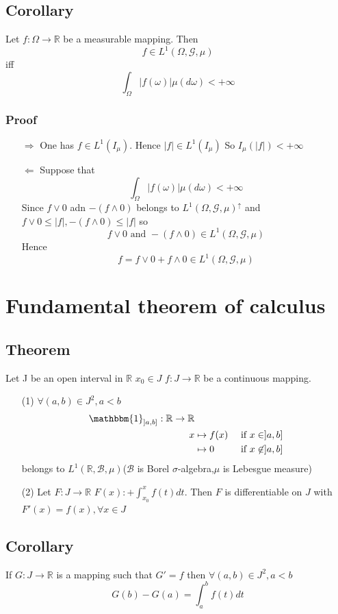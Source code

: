 \documentclass{book}
\newcommand{\abs}[1]{\left\lvert #1 \right\rvert}
\newcommand{\rightbracket}{]}
\begin{document}
\section{Corollary}
Let $f:\Omega\rightarrow\mathbb{R}$ be a measurable mapping. Then $$f\in L^1(\Omega,\mathcal{G},\mu)$$iff$$\int_\Omega\abs{f(\omega)}\mu(d\omega)<+\infty$$
\subsection*{Proof}
\begin{itemize}
    \item [$\Rightarrow$]One has $f\in L^1(I_\mu)$. Hence $\abs{f}\in L^1(I_\mu)$ So $I_\mu(\abs{f})<+\infty$
    \item [$\Leftarrow$]Suppose that $$\int_\Omega\abs{f(\omega)}\mu(d\omega)<+\infty$$Since $f\vee 0$ adn $-(f\wedge 0)$ belongs to $L^1(\Omega,\mathcal{G},\mu)^\uparrow$ and $f\vee 0\leq\abs{f},-(f\wedge0)\leq\abs{f}$ so $$ f\vee 0\text{ and }-(f\wedge 0)\in L^1(\Omega,\mathcal{G},\mu)$$
    Hence $$f=f\vee0+f\wedge0\in L^1(\Omega,\mathcal{G},\mu)$$
\end{itemize}
\chapter{Fundamental theorem of calculus}
\section{Theorem}
Let J be an open interval in $\mathbb{R}$ $x_0\in J$ $f:J\rightarrow\mathbb{R}$ be a continuous mapping.
\begin{itemize}
    \item[(1)]$\forall (a,b)\in J^2,a<b$
    $$\begin{aligned}
        \mathbbm{1}_{\rightbracket a,b\rightbracket}:\mathbb{R}\rightarrow\mathbb{R}\\ x&\mapsto f(x) &\text{ if }x\in \rightbracket a,b\rightbracket\\ &\mapsto 0&\text{ if }x\not\in \rightbracket a,b\rightbracket
    \end{aligned}$$
    belongs to $L^1(\mathbb{R},\mathscr{B},\mu)$($\mathscr{B}$ is Borel $\sigma$-algebra,$\mu$ is Lebesgue measure)
    \item [(2)]Let $F:J\rightarrow\mathbb{R}$ $F(x):+\int_{x_0}^xf(t)dt$. Then $F$ is differentiable on $J$ with $F'(x)=f(x),\forall x\in J$
\end{itemize}
\section{Corollary}
If $G:J\rightarrow\mathbb{R}$ is a mapping such that $G'=f$ then $\forall(a,b)\in J^2,a<b$ $$G(b)-G(a)=\int_a^bf(t)dt$$
\end{document}
